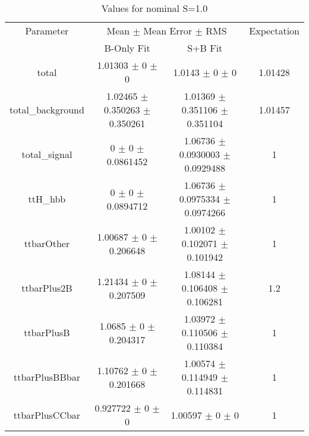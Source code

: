 \begin{table}
\centering
\caption{Values for nominal S=1.0}
\begin{tabular}{cccc}
\toprule
Parameter & \multicolumn{2}{c}{Mean $\pm$ Mean Error $\pm$ RMS} & Expectation\\
 & B-Only Fit & S+B Fit & \\
\midrule
total & \num{1.01303} $\pm$ \num{0} $\pm$ \num{0} & \num{1.0143} $\pm$ \num{0} $\pm$ \num{0} & \num{1.01428}\\
total\_background & \num{1.02465} $\pm$ \num{0.350263} $\pm$ \num{0.350261} & \num{1.01369} $\pm$ \num{0.351106} $\pm$ \num{0.351104} & \num{1.01457}\\
total\_signal & \num{0} $\pm$ \num{0} $\pm$ \num{0.0861452} & \num{1.06736} $\pm$ \num{0.0930003} $\pm$ \num{0.0929488} & \num{1}\\
ttH\_hbb & \num{0} $\pm$ \num{0} $\pm$ \num{0.0894712} & \num{1.06736} $\pm$ \num{0.0975334} $\pm$ \num{0.0974266} & \num{1}\\
ttbarOther & \num{1.00687} $\pm$ \num{0} $\pm$ \num{0.206648} & \num{1.00102} $\pm$ \num{0.102071} $\pm$ \num{0.101942} & \num{1}\\
ttbarPlus2B & \num{1.21434} $\pm$ \num{0} $\pm$ \num{0.207509} & \num{1.08144} $\pm$ \num{0.106408} $\pm$ \num{0.106281} & \num{1.2}\\
ttbarPlusB & \num{1.0685} $\pm$ \num{0} $\pm$ \num{0.204317} & \num{1.03972} $\pm$ \num{0.110506} $\pm$ \num{0.110384} & \num{1}\\
ttbarPlusBBbar & \num{1.10762} $\pm$ \num{0} $\pm$ \num{0.201668} & \num{1.00574} $\pm$ \num{0.114949} $\pm$ \num{0.114831} & \num{1}\\
ttbarPlusCCbar & \num{0.927722} $\pm$ \num{0} $\pm$ \num{0} & \num{1.00597} $\pm$ \num{0} $\pm$ \num{0} & \num{1}\\
\bottomrule
\end{tabular}
\end{table}